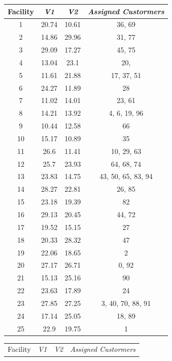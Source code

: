 \documentclass[12pt]{article}
\begin{document}
\begin{table}[h]
    
    \begin{minipage}{.49\linewidth}
    \begin{tabular}{|c|ccc|}
    \hline
    Facility & \textit{V1} & \textit{V2} & \textit{Assigned Custormers} \\
    \hline
1 & 20.74 & 10.61 &   36, 69  \\
2 & 14.86 & 29.96 &   31, 77  \\
3 & 29.09 & 17.27 &   45, 75  \\
4 & 13.04 & 23.1 &   20,   \\
5 & 11.61 & 21.88 &   17, 37, 51   \\
6 & 24.27 & 11.89 &   28     \\
7 & 11.02 & 14.01 &   23, 61  \\
8 & 14.21 & 13.92 &    4,  6, 19, 96  \\
9 & 10.44 & 12.58 &   66     \\
10 & 15.17 & 10.89 &   35     \\
11 & 26.6 & 11.41 &   10, 29, 63   \\
12 & 25.7 & 23.93 &   64, 68, 74   \\
13 & 23.83 & 14.75 &   43, 50, 65, 83,  94 \\
14 & 28.27 & 22.81 &   26, 85  \\
15 & 23.18 & 19.39 &   82     \\
16 & 29.13 & 20.45 &   44, 72  \\
17 & 19.52 & 15.15 &   27     \\
18 & 20.33 & 28.32 &   47     \\
19 & 22.06 & 18.65 &    2     \\
20 & 27.17 & 26.71 &    0, 92  \\
21 & 15.13 & 25.16 &   90     \\
22 & 23.63 & 17.89 &   24     \\
23 & 27.85 & 27.25 &    3, 40, 70, 88, 91 \\
24 & 17.14 & 25.05 &   18, 89  \\
25 & 22.9 & 19.75 &    1     \\
        \hline
    \end{tabular}
    \end{minipage}
     \begin{minipage}{.49\linewidth}
    \begin{tabular}{c|ccc|}
    \hline
    Facility & \textit{V1} & \textit{V2} & \textit{Assigned Custormers} \\

\end{tabular}
\end{minipage}
\end{table}
\end{document}
